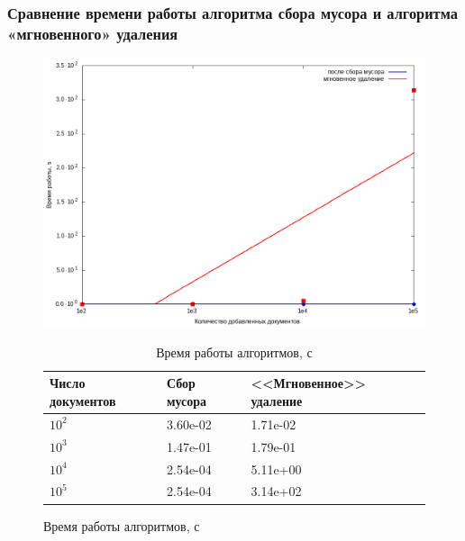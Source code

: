 \documentclass[aspectratio=169, pdf, 8pt, unicode]{beamer}
\begin{document}
\begin{frame}[fragile]
\frametitle{Сравнение времени работы алгоритма сбора мусора и алгоритма
«мгновенного» удаления}
\begin{figure}[H]
\centering
\begin{minipage}[h]{0.475\linewidth}
\includegraphics[width=1\textwidth]{fig/time.png}
\caption{Зависимость времени работы алгоритма от количества добавленных документов}
\end{minipage}
\hfil
\begin{minipage}[h]{0.35\linewidth}
\begin{table}[H]
      \caption{Время работы алгоритмов, с}
      \centering
      \small
      \singlespacing
      \begin{tabular}{|p{1.5cm}|p{1.5cm}|p{2cm}|}
        \hline
        Число документов & Сбор мусора                & <<Мгновенное>> удаление \\ \hline \hline
        $10^2$           & 3.60e-02                   & 1.71e-02              \\ \hline
        $10^3$           & 1.47e-01                   & 1.79e-01              \\ \hline
        $10^4$           & 2.54e-04                   & 5.11e+00              \\ \hline
        $10^5$           & 2.54e-04                   & 3.14e+02              \\ \hline
\end{tabular}
\end{table}
\end{minipage}
\end{figure}
\end{frame}
\end{document}
